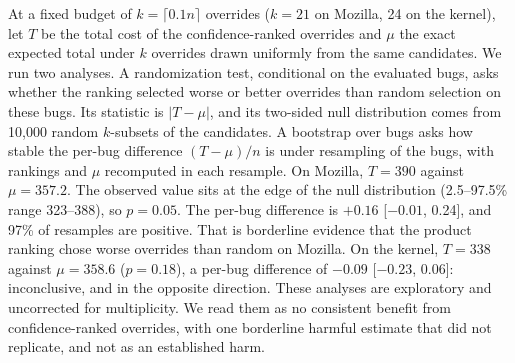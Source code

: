 \begin{colfigure}
\centering
{}
\caption{Every AUROC in the paper with its interval; dashed line: chance.
Only \choice{}'s confidence discriminates its own errors. Composed
confidence is at chance for both escalation targets, (A) and (B).}
\label{fig:forest}
\end{colfigure}


 At a fixed budget of
$k = \lceil 0.1n \rceil$ overrides ($k = 21$ on Mozilla, 24 on the kernel),
let $T$ be the total cost of the confidence-ranked overrides and $\mu$ the
exact expected total under $k$ overrides drawn uniformly from the same
candidates. We run two analyses. A randomization test, conditional on the evaluated bugs, asks whether the
ranking selected worse or better overrides than random selection
on these bugs. Its statistic is $|T - \mu|$, and its two-sided
null distribution comes from 10{,}000 random $k$-subsets of the
candidates. A bootstrap over bugs asks how stable the per-bug difference
$(T - \mu)/n$ is under resampling of the bugs, with rankings and $\mu$
recomputed in each resample. On Mozilla, $T = 390$ against $\mu = 357.2$. The observed value sits at
the edge of the null distribution (2.5--97.5\% range 323--388), so
$p = 0.05$. The per-bug difference is $+0.16$ [$-0.01$, 0.24], and 97\% of
resamples are positive. That is borderline evidence that the product
ranking chose worse overrides than random on Mozilla. On the
kernel, $T = 338$ against $\mu = 358.6$ ($p = 0.18$), a per-bug difference
of $-0.09$ [$-0.23$, 0.06]: inconclusive, and in the opposite direction.
These analyses are exploratory and uncorrected for multiplicity. We read
them as no consistent benefit from confidence-ranked overrides, with one
borderline harmful estimate that did not replicate, and not as an
established harm.

